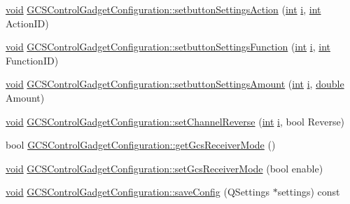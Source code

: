 \begin{DoxyCompactItemize}
\item 
\hyperlink{group___u_a_v_objects_plugin_ga444cf2ff3f0ecbe028adce838d373f5c}{void} \hyperlink{group___g_c_s_control_gadget_plugin_ga59dbcf37f9417c485b9c8a021563a530}{G\-C\-S\-Control\-Gadget\-Configuration\-::setbutton\-Settings\-Action} (\hyperlink{ioapi_8h_a787fa3cf048117ba7123753c1e74fcd6}{int} \hyperlink{uavobjecttemplate_8m_a6f6ccfcf58b31cb6412107d9d5281426}{i}, \hyperlink{ioapi_8h_a787fa3cf048117ba7123753c1e74fcd6}{int} Action\-I\-D)
\item 
\hyperlink{group___u_a_v_objects_plugin_ga444cf2ff3f0ecbe028adce838d373f5c}{void} \hyperlink{group___g_c_s_control_gadget_plugin_ga67d36d085e0ada006406d7cd2569e226}{G\-C\-S\-Control\-Gadget\-Configuration\-::setbutton\-Settings\-Function} (\hyperlink{ioapi_8h_a787fa3cf048117ba7123753c1e74fcd6}{int} \hyperlink{uavobjecttemplate_8m_a6f6ccfcf58b31cb6412107d9d5281426}{i}, \hyperlink{ioapi_8h_a787fa3cf048117ba7123753c1e74fcd6}{int} Function\-I\-D)
\item 
\hyperlink{group___u_a_v_objects_plugin_ga444cf2ff3f0ecbe028adce838d373f5c}{void} \hyperlink{group___g_c_s_control_gadget_plugin_ga1f4c5dc258f49bb185227cb603dbd088}{G\-C\-S\-Control\-Gadget\-Configuration\-::setbutton\-Settings\-Amount} (\hyperlink{ioapi_8h_a787fa3cf048117ba7123753c1e74fcd6}{int} \hyperlink{uavobjecttemplate_8m_a6f6ccfcf58b31cb6412107d9d5281426}{i}, \hyperlink{_super_l_u_support_8h_a8956b2b9f49bf918deed98379d159ca7}{double} Amount)
\item 
\hyperlink{group___u_a_v_objects_plugin_ga444cf2ff3f0ecbe028adce838d373f5c}{void} \hyperlink{group___g_c_s_control_gadget_plugin_gae6d33c4f9082a7cee4223f5793c82a45}{G\-C\-S\-Control\-Gadget\-Configuration\-::set\-Channel\-Reverse} (\hyperlink{ioapi_8h_a787fa3cf048117ba7123753c1e74fcd6}{int} \hyperlink{uavobjecttemplate_8m_a6f6ccfcf58b31cb6412107d9d5281426}{i}, bool Reverse)
\item 
bool \hyperlink{group___g_c_s_control_gadget_plugin_ga0b4cab5db5d6ffe6b93d7cb9be5de2c8}{G\-C\-S\-Control\-Gadget\-Configuration\-::get\-Gcs\-Receiver\-Mode} ()
\item 
\hyperlink{group___u_a_v_objects_plugin_ga444cf2ff3f0ecbe028adce838d373f5c}{void} \hyperlink{group___g_c_s_control_gadget_plugin_gac753abb3d8930e2296c8e9c056a4ee1f}{G\-C\-S\-Control\-Gadget\-Configuration\-::set\-Gcs\-Receiver\-Mode} (bool enable)
\item 
\hyperlink{group___u_a_v_objects_plugin_ga444cf2ff3f0ecbe028adce838d373f5c}{void} \hyperlink{group___g_c_s_control_gadget_plugin_ga5b7df7d2f0deddc5241efd65f199fb05}{G\-C\-S\-Control\-Gadget\-Configuration\-::save\-Config} (Q\-Settings $\ast$settings) const 

\end{DoxyCompactItemize}
